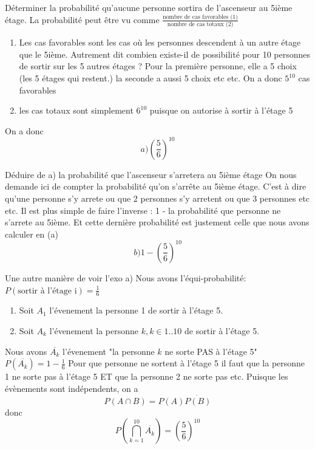 	\begin{exo}
		\begin{subexo} {Déterminer la probabilité qu’aucune personne sortira de l’ascenseur au 5ième étage.}
			La probabilité peut être vu comme $\frac{\text{nombre de cas favorables (1)}}{\text{nombre de cas totaux (2)}}$
			
				\begin{enumerate}[label=(\arabic*)]
					\item Les cas favorables sont les cas où les personnes descendent à un autre étage que le 5ième.
					Autrement dit combien existe-il de possibilité pour 10 personnes de sortir sur les 5 autres étages ?
					Pour la première personne, elle a 5 choix (les 5 étages qui restent.) la seconde a aussi 5 choix etc etc.
					On a donc $5^{10}$ cas favorables
					\item les cas totaux sont simplement $6^{10}$ puisque on autorise à sortir à l'étage 5
				\end{enumerate}
				On a donc $$a) \left(\frac{5}{6}\right)^{10}$$
			
		\end{subexo}
		\begin{subexo}{Déduire de a) la probabilité que l'ascenseur s'arretera au 5ième étage}
				On nous demande ici de compter la probabilité qu'on s'arrête au 5ième étage. C'est à dire qu'une personne s'y arrete ou que 2 personnes s'y arretent ou que 3 personnes etc etc.
			Il est plus simple de faire l'inverse : 1 - la probabilité que personne ne s'arrete au 5ième. Et cette dernière probabilité est justement celle que nous avons calculer en (a)
			$$b)1 - \left( \dfrac{5}{6} \right)^{10}$$
			\end{subexo}
		\begin{subexo}{Une autre manière de voir l'exo a)}
			Nous avons l'équi-probabilité: $ P({\text{sortir à l'étage i}}) = \frac{1}{6}$
			\begin{enumerate}
				\item 			Soit $A_1$ l'évenement la personne 1 de sortir à l'étage 5. 
\item 			Soit $A_k$ l'évenement la personne $k, k\in 1..10$ de sortir à l'étage 5.

			\end{enumerate}
			Nous avons $\overline{A_k}$ l'évenement "la personne $k$ ne sorte PAS à l'étage 5" $P(\overline{A_k}) = 1 -\frac{1}{6}$
			Pour que personne ne sortent à l'étage 5 il faut que la personne 1 ne sorte pas à l'étage 5 ET que la personne 2 ne sorte pas etc.
			\newline
			Puisque les évènements sont indépendents, on a $$P(A \cap B) =P(A) \dot{ P(B)} $$
			donc $$ P\left( \bigcap_{k=1}^{10}\overline{A_{k}}\right) = \left(\frac{5}{6}\right)^{10}$$
		\end{subexo}
	\end{exo}
	
